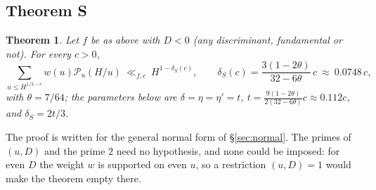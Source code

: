 \documentclass[11pt,a4paper]{article}
\newtheorem{theorem}{Theorem}\newtheorem{proposition}[theorem]{Proposition}\newtheorem{lemma}[theorem]{Lemma}
\begin{document}
\subsection{Theorem S}
\begin{theorem}\label{thm:S}
Let $f$ be as above with $D<0$ (any discriminant, fundamental or not). For every $c>0$,
\[\sum_{u\le H^{1/3-c}}w(u)\mathcal P_u(H/u)\ \ll_{f,c}\ H^{1-\delta_S(c)},\qquad \delta_S(c)=\frac{3(1-2\theta)}{32-6\theta}\,c\ \approx\ 0.0748\,c ,\]
with $\theta=7/64$; the parameters below are $\delta=\eta=\eta'=t$, $t=\frac{9(1-2\theta)}{2(32-6\theta)}c\approx0.112c$, and $\delta_S=2t/3$.
\end{theorem}
The proof is written for the general normal form of \S\ref{sec:normal}. The primes of $(u,D)$ and the prime $2$ need no hypothesis, and none could be imposed: for even $D$ the
weight $w$ is supported on even $u$, so a restriction $(u,D)=1$ would make the theorem empty there.
\end{document}
